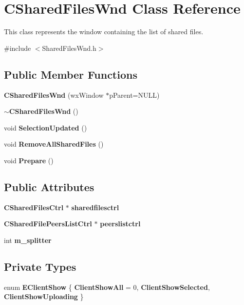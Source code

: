 \section{CSharedFilesWnd Class Reference}
\label{classCSharedFilesWnd}


This class represents the window containing the list of shared files.  


{\ttfamily \#include $<$SharedFilesWnd.h$>$}\subsection*{Public Member Functions}
\begin{DoxyCompactItemize}
\item 
{\bf CSharedFilesWnd} (wxWindow $\ast$pParent=NULL)\label{classCSharedFilesWnd_aabf3bc4d789b01be16aa081b3048979b}

\item 
{\bf $\sim$CSharedFilesWnd} ()\label{classCSharedFilesWnd_a91985d91dc2b4b5c4d851342ae5cffb3}

\item 
void {\bf SelectionUpdated} ()
\item 
void {\bf RemoveAllSharedFiles} ()\label{classCSharedFilesWnd_a95e718674780140defc041d01f404972}

\item 
void {\bf Prepare} ()
\end{DoxyCompactItemize}
\subsection*{Public Attributes}
\begin{DoxyCompactItemize}
\item 
{\bf CSharedFilesCtrl} $\ast$ {\bf sharedfilesctrl}\label{classCSharedFilesWnd_a0f0e1c8ffc045fa4ab5a5c7438719471}

\item 
{\bf CSharedFilePeersListCtrl} $\ast$ {\bf peerslistctrl}\label{classCSharedFilesWnd_a8ada8d3b4ca2144fe3f162bbda029a1f}

\item 
int {\bf m\_\-splitter}\label{classCSharedFilesWnd_a92fa9e42cb4f9f99048b3e6e0cd54b0b}

\end{DoxyCompactItemize}
\subsection*{Private Types}
\begin{DoxyCompactItemize}
\item 
enum {\bf EClientShow} \{ {\bfseries ClientShowAll} =  0, 
{\bfseries ClientShowSelected}, 
{\bfseries ClientShowUploading}
 \}
\end{DoxyCompactItemize}
